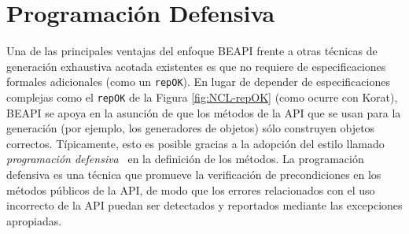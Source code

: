 





\section{Programación Defensiva}
\label{sec:defensiveProgramming}

Una de las principales ventajas del enfoque \textsf{BEAPI} frente a otras
técnicas de generación exhaustiva acotada existentes 
es que no requiere de especificaciones formales adicionales (como 
un \texttt{repOK}).
En lugar de depender de especificaciones complejas como el \texttt{repOK} de la
Figura \ref{fig:NCL-repOK} (como ocurre con \textsf{Korat}), \textsf{BEAPI} se
apoya en la asunción de que los métodos de la API que se usan para la generación
(por ejemplo, los generadores de objetos) sólo construyen objetos correctos.
Típicamente, esto es posible gracias a la adopción del estilo llamado
\emph{programación defensiva}~\cite{Liskov00} en la definición de los métodos. 
La programación defensiva es una técnica que promueve la verificación de
precondiciones en los métodos públicos de la API, de modo que los errores 
relacionados con el uso incorrecto de la API puedan ser detectados y reportados
mediante las excepciones apropiadas.

